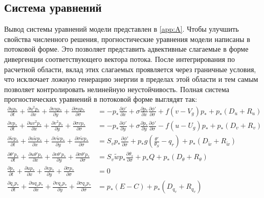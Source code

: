 \documentclass[12pt,a4paper]{report}
\begin{document}
\subsection{Система уравнений}
Вывод системы уравнений модели представлен в \ref{app:A}. Чтобы улучшить свойства численного решения, прогностические уравнения модели написаны в потоковой форме. Это позволяет представить адвективные слагаемые в форме дивергенции соответствующего вектора потока. После интегрирования по расчетной области, вклад этих слагаемых проявляется через граничные условия, что исключает ложную генерацию энергии в пределах этой области и тем самым позволяет контролировать нелинейную неустойчивость. Полная система прогностических уравнений в потоковой форме выглядят так:
\begin{subequations}\label{eq:progn0}
\begin{align}
\frac{\partial{up_*}}{\partial{t}} + \frac{\partial{u^2p_*}}{\partial{x}}+ \frac{\partial{vup_*}}{\partial{y}}+ \frac{\partial{\dot{\sigma}up_*}}{\partial{\sigma}}&=-p_* \frac{\partial{\phi'}}{\partial{x}}+\sigma \frac{\partial{p_*}}{\partial{x}}\frac{\partial{\phi'}}{\partial{\sigma}}+f(v-V_g )p_*+p_*(D_u+R_u )\label{eq:progn1} \\
\frac{\partial{vp_*}}{\partial{t}} + \frac{\partial{uv^2p_*}}{\partial{x}}+ \frac{\partial{v^2p_*}}{\partial{y}}+ \frac{\partial{\dot{\sigma}vp_*}}{\partial{\sigma}}&=-p_* \frac{\partial{\phi'}}{\partial{y}}+\sigma \frac{\partial{p_*}}{\partial{y}}\frac{\partial{\phi'}}{\partial{\sigma}}-f(u-U_g )p_*+p_*(D_v+R_v )\label{eq:progn2} \\
\frac{\partial{\tilde{w}p_*}}{\partial{t}} + \frac{\partial{u\tilde{w}p_*}}{\partial{x}}+ \frac{\partial{v\tilde{w}p_*}}{\partial{y}}+ \frac{\partial{\dot{\sigma}\tilde{w}p_*}}{\partial{\sigma}}&=S_vp_*\frac{\partial{\phi'}}{\partial{\sigma}}+p_*g(\frac{\theta'}{\theta_S}-q_r)+p_*(D_{\tilde{w}}+R_{\tilde{w}})\label{eq:progn3} \\
\frac{\partial{\theta'p_*}}{\partial{t}} + \frac{\partial{u\theta'p_*}}{\partial{x}}+ \frac{\partial{v\theta'p_*}}{\partial{y}}+ \frac{\partial{\dot{\sigma}\theta'p_*}}{\partial{\sigma}}&=S_v\tilde{w}p_* \frac{\partial{\theta_s}}{\partial{\sigma}}+p_*Q+p_*(D_{\theta}+R_{\theta})\label{eq:progn4} \\
\frac{\partial{p_*}}{\partial{t}} + \frac{\partial{up_*}}{\partial{x}}+ \frac{\partial{vp_*}}{\partial{y}}+ \frac{\partial{\dot{\sigma}p_*}}{\partial{\sigma}}&=0\label{eq:progn5} \\
\frac{\partial{q_vp_*}}{\partial{t}} + \frac{\partial{uq_vp_*}}{\partial{x}}+ \frac{\partial{vq_vp_*}}{\partial{y}}+ \frac{\partial{\dot{\sigma}q_vp_*}}{\partial{\sigma}}&=p_*(E-C)+p_*(D_{q_v}+R_{q_v})\label{eq:progn6} \\

\end{align}
\end{subequations}
\end{document}
